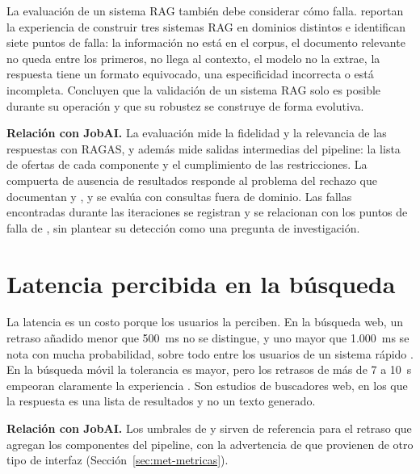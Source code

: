La evaluación de un sistema RAG también debe considerar cómo falla. \citet{Barnett2024} reportan la experiencia de construir tres sistemas RAG en dominios distintos e identifican siete puntos de falla: la información no está en el corpus, el documento relevante no queda entre los primeros, no llega al contexto, el modelo no la extrae, la respuesta tiene un formato equivocado, una especificidad incorrecta o está incompleta. Concluyen que la validación de un sistema RAG solo es posible durante su operación y que su robustez se construye de forma evolutiva.

\textbf{Relación con JobAI.} La evaluación mide la fidelidad y la relevancia de las respuestas con RAGAS, y además mide salidas intermedias del pipeline: la lista de ofertas de cada componente y el cumplimiento de las restricciones. La compuerta de ausencia de resultados responde al problema del rechazo que documentan \citet{Chen2024RGB} y \citet{Peng2025}, y se evalúa con consultas fuera de dominio. Las fallas encontradas durante las iteraciones se registran y se relacionan con los puntos de falla de \citet{Barnett2024}, sin plantear su detección como una pregunta de investigación.

\section{Latencia percibida en la búsqueda}
\label{sec:estado-arte-latencia}

La latencia es un costo porque los usuarios la perciben. En la búsqueda web, un retraso añadido menor que 500~ms no se distingue, y uno mayor que 1.000~ms se nota con mucha probabilidad, sobre todo entre los usuarios de un sistema rápido \citep{Arapakis2014,Bai2017}. En la búsqueda móvil la tolerancia es mayor, pero los retrasos de más de 7 a 10~s empeoran claramente la experiencia \citep{Arapakis2021}. Son estudios de buscadores web, en los que la respuesta es una lista de resultados y no un texto generado.

\textbf{Relación con JobAI.} Los umbrales de \citet{Arapakis2014} y \citet{Bai2017} sirven de referencia para el retraso que agregan los componentes del pipeline, con la advertencia de que provienen de otro tipo de interfaz (Sección~\ref{sec:met-metricas}).

